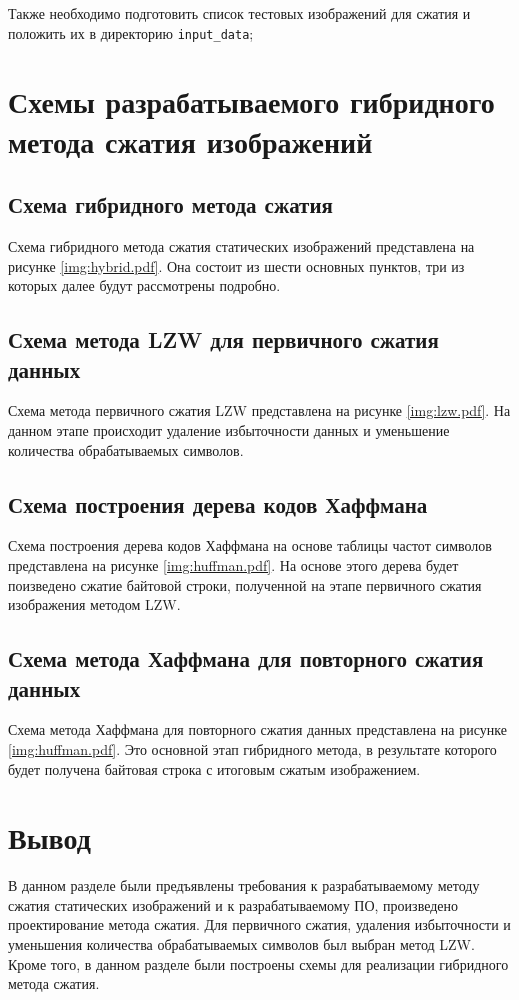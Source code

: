 Также необходимо подготовить список тестовых изображений для сжатия и положить их в директорию \texttt{input\_data};


\section{Схемы разрабатываемого гибридного метода сжатия изображений}

\subsection{Схема гибридного метода сжатия}

Схема гибридного метода сжатия статических изображений представлена на рисунке \ref{img:hybrid.pdf}. Она состоит из шести основных пунктов, три из которых далее будут рассмотрены подробно.

\clearpage
\subsection{Схема метода LZW для первичного сжатия данных}

Схема метода первичного сжатия LZW представлена на рисунке \ref{img:lzw.pdf}. На данном этапе происходит удаление избыточности данных и уменьшение количества обрабатываемых символов.

\clearpage
\subsection{Схема построения дерева кодов Хаффмана}

Схема построения дерева кодов Хаффмана на основе таблицы частот символов представлена на рисунке \ref{img:huffman.pdf}. На основе этого дерева будет поизведено сжатие байтовой строки, полученной на этапе первичного сжатия изображения методом LZW.

\clearpage
\subsection{Схема метода Хаффмана для повторного сжатия данных}

Схема метода Хаффмана для повторного сжатия данных представлена на рисунке \ref{img:huffman.pdf}. Это основной этап гибридного метода, в результате которого будет получена байтовая строка с итоговым сжатым изображением.

\section*{Вывод}

В данном разделе были предъявлены требования к разрабатываемому методу сжатия статических изображений и к разрабатываемому ПО, произведено проектирование метода сжатия. Для первичного сжатия, удаления избыточности и уменьшения количества обрабатываемых символов был выбран метод LZW. Кроме того, в данном разделе были построены схемы для реализации гибридного метода сжатия.
